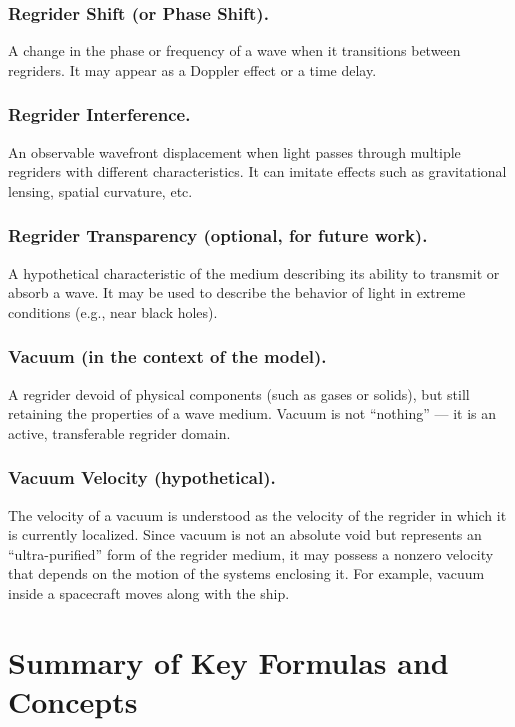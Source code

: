 \documentclass[12pt]{article}
\begin{document}
\subsubsection*{Regrider Shift (or Phase Shift).}
A change in the phase or frequency of a wave when it transitions between regriders. It may appear as a Doppler effect or a time delay.

\subsubsection*{Regrider Interference.}
An observable wavefront displacement when light passes through multiple regriders with different characteristics. It can imitate effects such as gravitational lensing, spatial curvature, etc.

\subsubsection*{Regrider Transparency (optional, for future work).}
A hypothetical characteristic of the medium describing its ability to transmit or absorb a wave. It may be used to describe the behavior of light in extreme conditions (e.g., near black holes).

\subsubsection*{Vacuum (in the context of the model).}
A regrider devoid of physical components (such as gases or solids), but still retaining the properties of a wave medium. Vacuum is not “nothing” — it is an active, transferable regrider domain.

\subsubsection*{Vacuum Velocity (hypothetical).}
The velocity of a vacuum is understood as the velocity of the regrider in which it is currently localized. Since vacuum is not an absolute void but represents an “ultra-purified” form of the regrider medium, it may possess a nonzero velocity that depends on the motion of the systems enclosing it. For example, vacuum inside a spacecraft moves along with the ship.

\section*{Summary of Key Formulas and Concepts}
\end{document}
